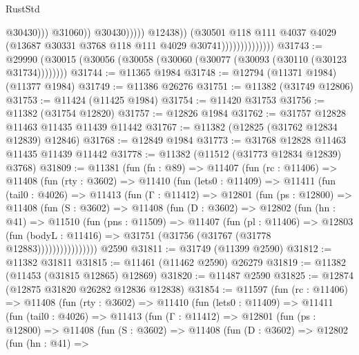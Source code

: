 \begin{lexlean}{RustStd}
\begin{coremodule}
                                                    @30430)))
                                              @31060))
                                          @30430)))))
                                @12438))
                            (@30501
                              @118
                              @111
                              @4037
                              @4029
                              (@13687 @30331 @3768 @118 @111 @4029 @30741))))))))))))))
@31743 := @29990 (@30015 (@30056 (@30058 (@30060 (@30077 (@30093 (@30110 (@30123 @31734))))))))
@31744 := @11365 @1984
@31748 := @12794 (@11371 @1984) (@11377 @1984)
@31749 := @11386 @26276
@31751 := @11382 (@31749 @12806)
@31753 := @11424 (@11425 @1984)
@31754 := @11420 @31753
@31756 := @11382 (@31754 @12820)
@31757 := @12826 @1984
@31762 := @31757 @12828 @11463 @11435 @11439 @11442
@31767 := @11382 (@12825 (@31762 @12834 @12839) @12846)
@31768 := @12849 @1984
@31773 := @31768 @12828 @11463 @11435 @11439 @11442
@31778 := @11382 (@11512 (@31773 @12834 @12839) @3768)
@31809 := @11381
    (fun (fn : @89) =>
    @11407
      (fun (rc : @11406) =>
      @11408
        (fun (rty : @3602) =>
        @11410
          (fun (lets0 : @11409) =>
          @11411
            (fun (tail0 : @4026) =>
            @11413
              (fun (Γ : @11412) =>
              @12801
                (fun (ps : @12800) =>
                @11408
                  (fun (S : @3602) =>
                  @11408
                    (fun (D : @3602) =>
                    @12802
                      (fun (hn : @41) =>
                      @11510
                        (fun (pns : @11509) =>
                        @11407
                          (fun (pl : @11406) =>
                          @12803
                            (fun (bodyL : @11416) =>
                            @31751 (@31756 (@31767 (@31778 @12883))))))))))))))))
    @2590
@31811 := @31749 (@11399 @2590)
@31812 := @11382 @31811
@31815 := @11461 (@11462 @2590) @26279
@31819 := @11382 (@11453 (@31815 @12865) @12869)
@31820 := @11487 @2590
@31825 := @12874 (@12875 @31820 @26282 @12836 @12838)
@31854 := @11597
    (fun (rc : @11406) =>
    @11408
      (fun (rty : @3602) =>
      @11410
        (fun (lets0 : @11409) =>
        @11411
          (fun (tail0 : @4026) =>
          @11413
            (fun (Γ : @11412) =>
            @12801
              (fun (ps : @12800) =>
              @11408
                (fun (S : @3602) =>
                @11408
                  (fun (D : @3602) =>
                  @12802
                    (fun (hn : @41) =>

\end{coremodule}
\end{lexlean}
